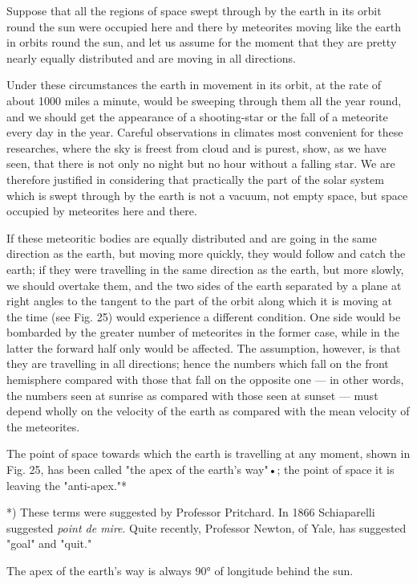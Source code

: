 \documentclass[a4paper, 12pt, oneside, polutonikogreek, english]{article}
\begin{document}
Suppose that all the regions of space swept through by the earth in its orbit round the sun were occupied here and there by meteorites moving like the earth in orbits round the sun, and let us assume for the moment that they are pretty nearly equally distributed and are moving in all directions.

Under these circumstances the earth in movement in its orbit, at the rate of about 1000 miles a minute, would be sweeping through them all the year round, and we should get the appearance of a shooting-star or the fall of a meteorite every day in the year. Careful observations in climates most convenient for these researches, where the sky is freest from cloud and is purest, show, as we have seen, that there is not only no night but no hour without a falling star. We are therefore justified in considering that practically the part of the solar system which is swept through by the earth is not a vacuum, not empty space, but space occupied by meteorites here and there.

If these meteoritic bodies are equally distributed and are going in the same direction as the earth, but moving more quickly, they would follow and catch the earth; if they were travelling in the same direction as the earth, but more slowly, we should overtake them, and the two sides of the earth separated by a plane at right angles to the tangent to the part of the orbit along which it is moving at the time (see Fig. 25) would experience a different condition. One side would be bombarded by the greater number of meteorites in the former case, while in the latter the forward half only would be affected. The assumption, however, is that they are travelling in all directions; hence the numbers which fall on the front hemisphere compared with those that fall on the opposite one --- in other words, the numbers seen at sunrise as compared with those seen at sunset --- must depend wholly on the velocity of the earth as compared with the mean velocity of the meteorites.

The point of space towards which the earth is travelling at any moment, shown in Fig. 25, has been called "the apex of the earth's way"•; the point of space it is leaving the "anti-apex."*

*) These terms were suggested by Professor Pritchard. In 1866 Schiaparelli suggested \emph{point de mire}. Quite recently, Professor Newton, of Yale, has suggested "goal" and "quit."

The apex of the earth's way is always 90° of longitude behind the sun.
\end{document}
